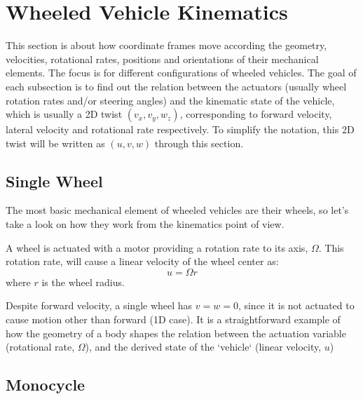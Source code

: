 \section{Wheeled Vehicle Kinematics}
This section is about how coordinate frames move according the geometry, velocities, rotational rates, positions and orientations of their mechanical elements. The focus is for different configurations of wheeled vehicles. The goal of each subsection is to find out the relation between the actuators (usually wheel rotation rates and/or steering angles) and the kinematic state of the vehicle, which is usually a 2D twist $(v_x, v_y, w_z)$, corresponding to forward velocity, lateral velocity and rotational rate respectively. To simplify the notation, this 2D twist will be written as $(u, v, w)$ through this section. 

\subsection{Single Wheel}
The most basic mechanical element of wheeled vehicles are their wheels, so let's take a look on how they work from the kinematics point of view.

A wheel is actuated with a motor providing a rotation rate to its axis, $\Omega$. This rotation rate, will cause a linear velocity of the wheel center as: 
\begin{equation}
 u = \Omega r
\end{equation}
where $r$ is the wheel radius. 

Despite forward velocity, a single wheel has $v = w = 0$, since it is not actuated to cause motion other than forward (1D case). It is a straightforward example of how the geometry of a body shapes the relation between the actuation variable (rotational rate, $\Omega$), and the derived state of the `vehicle` (linear velocity, $u$)

\subsection{Monocycle}


